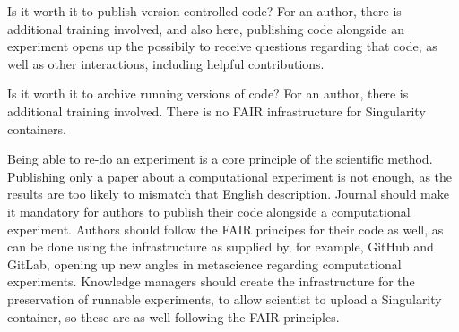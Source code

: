 Is it worth it to publish version-controlled code?
For an author, 
there is additional training involved, and also here,
publishing code alongside an experiment opens up
the possibily to receive questions regarding that code,
as well as other interactions, including helpful contributions.


Is it worth it to archive running versions of code?
For an author, 
there is additional training involved.
There is no FAIR infrastructure for Singularity containers.



Being able to re-do an experiment is a core principle of the scientific method.
Publishing only a paper about a computational experiment is not enough,
as the results are too likely to mismatch that English description.
Journal should make it mandatory for authors
to publish their code alongside a computational experiment.
Authors should follow the FAIR principes for their code as well,
as can be done using the infrastructure as supplied by, 
for example, GitHub and GitLab, opening up new angles in
metascience regarding computational experiments.
Knowledge managers should create the infrastructure for the preservation
of runnable experiments, to allow scientist to upload a Singularity
container, so these are as well following the FAIR principles.

